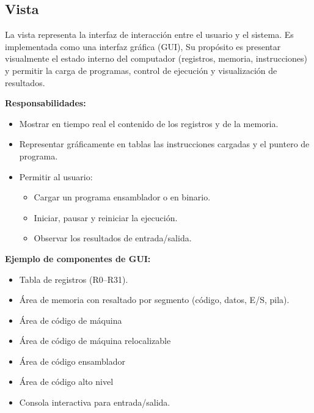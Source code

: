 \documentclass{article}
\begin{document}
\subsection{Vista}

La vista representa la interfaz de interacción entre el usuario y el sistema.
Es implementada como una interfaz gráfica (GUI),
Su propósito es presentar visualmente el estado interno
del computador (registros, memoria, instrucciones) y permitir la carga de programas,
control de ejecución y visualización de resultados.

\textbf{Responsabilidades:}
\begin{itemize}
  \item Mostrar en tiempo real el contenido de los registros y de la memoria.
  \item Representar gráficamente en tablas las instrucciones cargadas y el puntero de programa.
  \item Permitir al usuario:
        \begin{itemize}
          \item Cargar un programa ensamblador o en binario.
          \item Iniciar, pausar y reiniciar la ejecución.
          \item Observar los resultados de entrada/salida.
        \end{itemize}
\end{itemize}

\textbf{Ejemplo de componentes de GUI:}
\begin{itemize}
  \item Tabla de registros (R0–R31).
  \item Área de memoria con resaltado por segmento (código, datos, E/S, pila).
  \item Área de código de máquina
  \item Área de código de máquina relocalizable
  \item Área de código ensamblador
  \item Área de código alto nivel
  \item Consola interactiva para entrada/salida.
\end{itemize}



\end{document}
